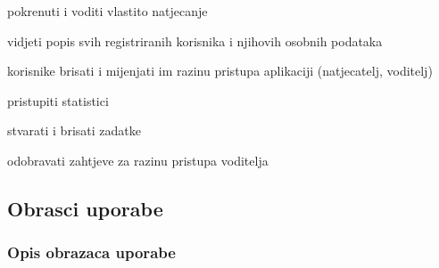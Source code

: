 \begin{packed_enum}
\begin{packed_enum}
				\end{packed_enum}
			
				\item  {}
				
				\begin{packed_enum}
					
					\item pokrenuti i voditi vlastito natjecanje 
					
				\end{packed_enum}
				
				\item  {}
				
				\begin{packed_enum}
					
					\item vidjeti popis svih registriranih korisnika i njihovih osobnih podataka
					\item korisnike brisati i mijenjati im razinu pristupa aplikaciji (natjecatelj, voditelj)
					\item pristupiti statistici
					\item stvarati i brisati zadatke
					\item odobravati zahtjeve za razinu pristupa voditelja
					
				\end{packed_enum}
			
					
			\end{packed_enum}
			
			\eject 
			
			
				
			\subsection{Obrasci uporabe}
				
				\subsubsection{Opis obrazaca uporabe}

